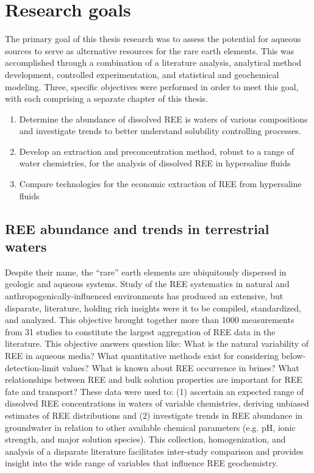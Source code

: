 \section{Research goals}

The primary goal of this thesis research was to assess the potential for aqueous sources to serve as alternative resources for the rare earth elements.
This was accomplished through a combination of a literature analysis, analytical method development, controlled experimentation, and statistical and geochemical modeling.
Three, specific objectives were performed in order to meet this goal, with each comprising a separate chapter of this thesis.

\begin{enumerate}[label=\textbf{Objective \arabic*:}, leftmargin=*]
\item Determine the abundance of dissolved REE is waters of various compositions and investigate trends to better understand solubility controlling processes.
\item Develop an extraction and preconcentration method, robust to a range of water chemistries, for the analysis of dissolved REE in hypersaline fluids
\item Compare technologies for the economic extraction of REE from hypersaline fluids
\end{enumerate}

\subsection{REE abundance and trends in terrestrial waters}

Despite their name, the ``rare'' earth elements are ubiquitously dispersed in geologic and aqueous systems.
Study of the REE systematics in natural and anthropogenically-influenced environments has produced an extensive, but disparate, literature, holding rich insights were it to be compiled, standardized, and analyzed.
This objective brought together more than 1000 measurements from 31 studies to constitute the largest aggregation of REE data in the literature.
This objective answers question like: What is the natural variability of REE in aqueous media?
What quantitative methods exist for considering below-detection-limit values?
What is known about REE occurrence in brines?
What relationships between REE and bulk solution properties are important for REE fate and transport?
These data were used to: (1) ascertain an expected range of dissolved REE concentrations in waters of variable chemistries, deriving unbiased estimates of REE distributions and
(2) investigate trends in REE abundance in groundwater in relation to other available chemical parameters (e.g. pH, ionic strength, and major solution species).
This collection, homogenization, and analysis of a disparate literature facilitates inter-study comparison and provides insight into the wide range of variables that influence REE geochemistry.


